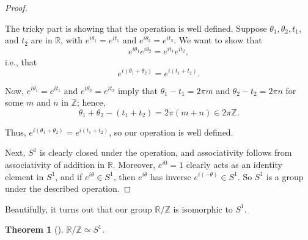 \documentclass[10pt,]{book}
\theoremstyle{plain}
\newtheorem{theorem}{Theorem}[section]
\theoremstyle{definition}
\theoremstyle{definition}
\theoremstyle{definition}
\theoremstyle{definition}
\numberwithin{equation}{section}
\def\Z{\mathbb{Z}}
\def\R{\mathbb{R}}
\begin{document}
\begin{proof}\hypertarget{proof-53}{}
The tricky part is showing that the operation is well defined. Suppose \(\theta_1, \theta_2, t_1\), and \(t_2\) are in \(\R\), with \(e^{i\theta_1}=e^{it_1}\) and \(e^{i\theta_2}=e^{it_2}\). We want to show that%
\begin{equation*}
e^{i\theta_1}e^{i\theta_2}=e^{it_1}e^{it_2},
\end{equation*}
i.e., that%
\begin{equation*}
e^{i(\theta_1+\theta_2)}=e^{i(t_1+t_2)}.
\end{equation*}
%
\par
Now, \(e^{i\theta_1}=e^{it_1}\) and \(e^{i\theta_2}=e^{it_2}\) imply that \(\theta_1 -t_1 = 2\pi m\) and \(\theta_2-t_2 = 2\pi n\) for some \(m\) and \(n\) in \(\Z\); hence,%
\begin{equation*}
\theta_1+\theta_2-(t_1+t_2)= 2\pi(m+n) \in 2\pi\Z.
\end{equation*}
%
\par
Thus, \(e^{i(\theta_1+\theta_2)}=e^{i(t_1+t_2)}\), so our operation is well defined.%
\par
Next, \(S^1\) is clearly closed under the operation, and associativity follows from associativity of addition in \(\R\). Moreover, \(e^{i0}=1\) clearly acts as an identity element in \(S^1\), and if \(e^{i\theta}\in S^1\), then \(e^{i\theta}\) has inverse \(e^{i(-\theta)} \in S^1\). So \(S^1\) is a group under the described operation.%
\end{proof}
Beautifully, it turns out that our group \(\R/\Z\) is isomorphic to \(S^1\).%
\begin{theorem}[{}]\label{theorem-65}
\(\R/\Z \simeq S^1\).%
\end{theorem}
\end{document}
